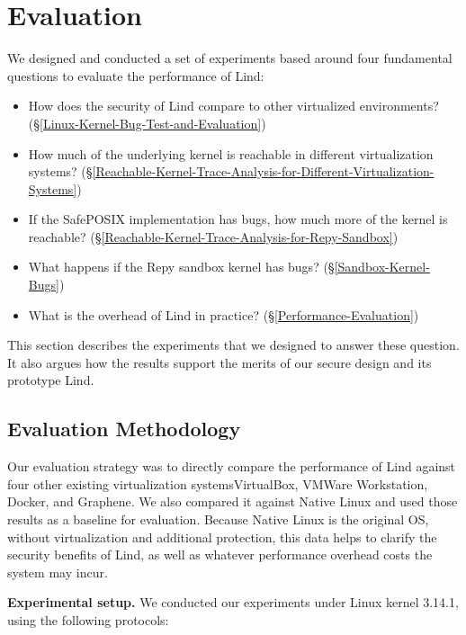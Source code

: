 \section{Evaluation}
\label{sec.evaluation}

We designed and conducted a set of experiments based around four fundamental questions to evaluate the performance of Lind:

\begin{itemize}
\item How does the security of Lind compare to other virtualized environments?
(\S{\ref{Linux-Kernel-Bug-Test-and-Evaluation}})

\item How much of the underlying kernel is reachable in different
virtualization systems?
(\S{\ref{Reachable-Kernel-Trace-Analysis-for-Different-Virtualization-Systems}})

\item If the SafePOSIX implementation has bugs, how much more of the kernel is
reachable?
(\S{\ref{Reachable-Kernel-Trace-Analysis-for-Repy-Sandbox}})

\item What happens if the Repy sandbox kernel has bugs?
(\S{\ref{Sandbox-Kernel-Bugs}})

\item What is the overhead of Lind in practice?
(\S{\ref{Performance-Evaluation}})
\end{itemize}

This section describes the experiments that we designed to answer these
question. It also argues how the results support the merits of our secure design and its prototype Lind. 

\subsection{Evaluation Methodology}

Our evaluation strategy was to directly compare the performance of Lind
against 
four other existing virtualization systems\textendash VirtualBox, VMWare
Workstation, 
Docker, and Graphene. We also compared it against Native Linux and used 
those results as a baseline for evaluation. Because Native Linux is the
original OS, 
without virtualization and additional protection, this data helps to
clarify the security benefits of Lind, 
as well as whatever performance overhead costs the system may incur.

\textbf{Experimental setup.}
We conducted our experiments under Linux kernel 3.14.1, using the following
protocols:

